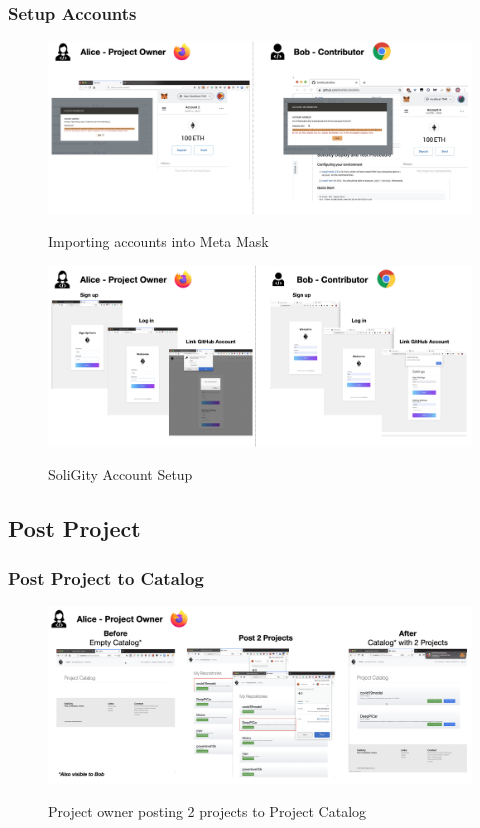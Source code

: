 \documentclass[12pt]{article}
\renewcommand{\_}{\kern-1.5pt\textunderscore\kern-1.5pt}
\begin{document}
\subsubsection{Setup Accounts}

\begin{figure}[H]
	\centering
	\includegraphics[width=16.5cm]{graphs/48. setup_3.png}\\
	\caption{Importing accounts into Meta Mask}
	\label{fig:setup5}
\end{figure}


\begin{figure}[H]
	\centering
	\includegraphics[width=16.5cm]{graphs/49. setup_4.png}\\
	\caption{SoliGity Account Setup}
	\label{fig:setup6}
\end{figure}

\subsection{Post Project}
\subsubsection{Post Project to Catalog}
\begin{figure}[H]
	\centering
	\includegraphics[width=16.5cm]{graphs/50. post_1.png}\\
	\caption{Project owner posting 2 projects to Project Catalog}
	\label{fig:post1}
\end{figure}
\end{document}
